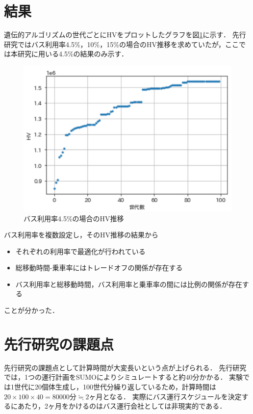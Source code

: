 \documentclass[main]{subfiles}
\begin{document}
    \section{結果}\label{senkoukekka}
    遺伝的アルゴリズムの世代ごとにHVをプロットしたグラフを図\ref{hv_plot}に示す．
    先行研究ではバス利用率4.5\%，10\%，15\%の場合のHV推移を求めていたが，ここでは本研究に用いる4.5\%の結果のみ示す．

    \begin{figure}
        \centering
        \includegraphics[width=\linewidth]{figures/hv_plot.png}
        \caption{バス利用率4.5\%の場合のHV推移}
        \label{hv_plot}
    \end{figure}

    バス利用率を複数設定し，そのHV推移の結果から
    \begin{itemize}
        \item それぞれの利用率で最適化が行われている
        \item 総移動時間-乗車率にはトレードオフの関係が存在する
        \item バス利用率と総移動時間，バス利用率と乗車率の間には比例の関係が存在する
    \end{itemize}
    ことが分かった．

    \section{先行研究の課題点}
    先行研究の課題点として計算時間が大変長いという点が上げられる．
    先行研究では，1つの運行計画をSUMOによりシミュレートすると約40分かかる．
    実験では1世代に20個体生成し，100世代分繰り返しているため，計算時間は$20\times 100\times 40 = 80000分 \fallingdotseq 2ヶ月$となる．
    実際にバス運行スケジュールを決定するにあたり，2ヶ月をかけるのはバス運行会社としては非現実的である．
\end{document}
